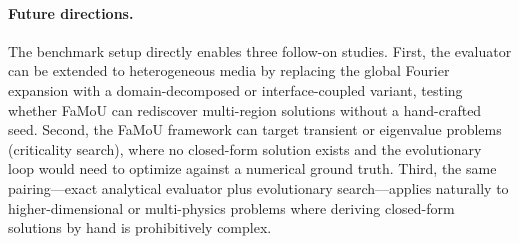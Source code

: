 \paragraph{Future directions.}
The benchmark setup directly enables three follow-on studies.
First, the evaluator can be extended to heterogeneous media by replacing the global Fourier expansion with a domain-decomposed or interface-coupled variant, testing whether FaMoU can rediscover multi-region solutions without a hand-crafted seed.
Second, the FaMoU framework can target transient or eigenvalue problems (criticality search), where no closed-form solution exists and the evolutionary loop would need to optimize against a numerical ground truth.
Third, the same pairing---exact analytical evaluator plus evolutionary search---applies naturally to higher-dimensional or multi-physics problems where deriving closed-form solutions by hand is prohibitively complex.
